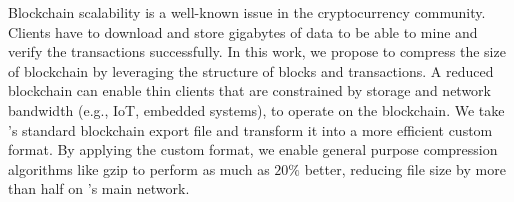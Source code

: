 Blockchain scalability is a well-known issue in the cryptocurrency community.
Clients have to download and store gigabytes of data to be able to mine and verify the transactions successfully.
In this work, we propose to compress the size of \eth{} blockchain by leveraging the structure of blocks and transactions.
A reduced blockchain can enable thin clients  that are constrained by storage and network bandwidth (e.g., IoT, embedded systems),
to operate on the \eth{} blockchain. We take \eth{}'s standard blockchain export file and transform it into a more
efficient custom format. By applying the custom format, we enable general purpose compression algorithms like gzip to perform
as much as $20\%$ better, reducing file size by more than half on \eth{}'s main network.
